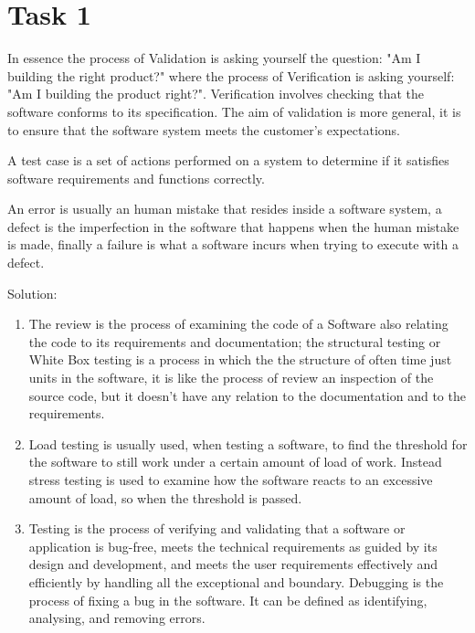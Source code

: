 \chapter{Task 1}
\begin{parlist}
	\item In essence the process of Validation is asking yourself the question: "Am I building the right product?" where the process of Verification is asking yourself: "Am I building the product right?". Verification involves checking that the software conforms to its specification. The aim of validation is more general, it is to ensure that the software system meets the customer's expectations. \cite{Sommerville:2004aa}
	\item A test case is a set of actions performed on a system to determine if it satisfies software requirements and functions correctly.\cite{techtargetWhatTest}
	\item An error is usually an human mistake that resides inside a software system, a defect is the imperfection in the software that happens when the human mistake is made, finally a failure is what a software incurs when trying to execute with a defect. \cite{toolsqaWhatDifference}
	\item Solution:
		\begin{enumerate}
			\item The review is the process of examining the code of a Software also relating the code to its requirements and documentation; the structural testing or White Box testing is a process in which the the structure of often time just units in the software, it is like the process of review an inspection of the source code, but it doesn't have any relation to the documentation and to the requirements. \cite{Sommerville:2004aa}\cite{wikipediaWhiteboxTesting}
			\item Load testing is usually used, when testing a software, to find the threshold for the software to still work under a certain amount of load of work. Instead stress testing is used to examine how the software reacts to an excessive amount of load, so when the threshold is passed.\cite{bmcPerformanceTesting}
			\item Testing is the process of verifying and validating that a software or application is bug-free, meets the technical requirements as guided by its design and development, and meets the user requirements effectively and efficiently by handling all the exceptional and boundary. Debugging is the process of fixing a bug in the software. It can be defined as identifying, analysing, and removing errors.\cite{geeksforgeeks}

\end{enumerate}
\end{parlist}
